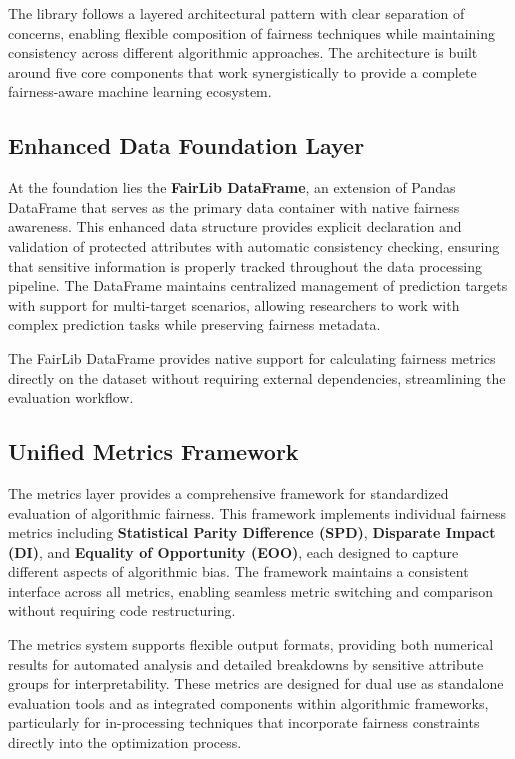 \documentclass[12pt,a4paper,openright,twoside]{book}
\begin{document}
The library follows a layered architectural pattern with clear separation of concerns, enabling flexible composition of fairness techniques while maintaining consistency across different algorithmic approaches. The architecture is built around five core components that work synergistically to provide a complete fairness-aware machine learning ecosystem.

\subsection{Enhanced Data Foundation Layer}

At the foundation lies the \textbf{FairLib DataFrame}, an extension of Pandas DataFrame that serves as the primary data container with native fairness awareness. This enhanced data structure provides explicit declaration and validation of protected attributes with automatic consistency checking, ensuring that sensitive information is properly tracked throughout the data processing pipeline. The DataFrame maintains centralized management of prediction targets with support for multi-target scenarios, allowing researchers to work with complex prediction tasks while preserving fairness metadata.

The FairLib DataFrame provides native support for calculating fairness metrics directly on the dataset without requiring external dependencies, streamlining the evaluation workflow.

\subsection{Unified Metrics Framework}

The metrics layer provides a comprehensive framework for standardized evaluation of algorithmic fairness. This framework implements individual fairness metrics including \textbf{Statistical Parity Difference (SPD)}, \textbf{Disparate Impact (DI)}, and \textbf{Equality of Opportunity (EOO)}, each designed to capture different aspects of algorithmic bias. The framework maintains a consistent interface across all metrics, enabling seamless metric switching and comparison without requiring code restructuring.

The metrics system supports flexible output formats, providing both numerical results for automated analysis and detailed breakdowns by sensitive attribute groups for interpretability. These metrics are designed for dual use as standalone evaluation tools and as integrated components within algorithmic frameworks, particularly for in-processing techniques that incorporate fairness constraints directly into the optimization process.
\end{document}
